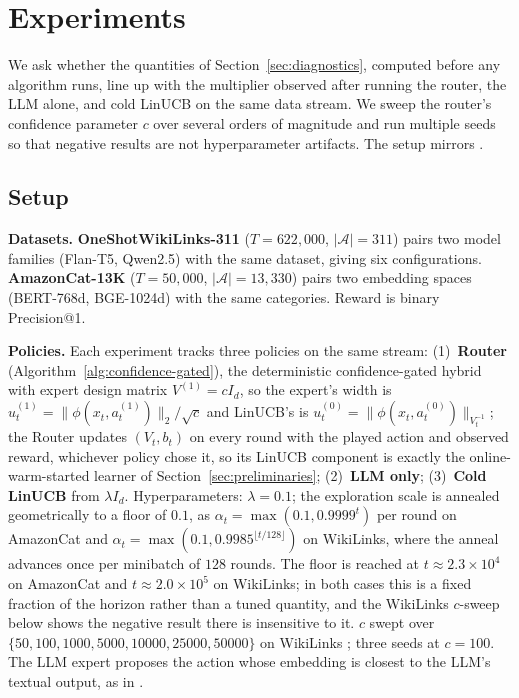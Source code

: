 \documentclass{article}
\theoremstyle{definition}
\theoremstyle{remark}
\theoremstyle{remark}
\begin{document}
\section{Experiments}
\label{sec:experiments}

We ask whether the quantities of Section~\ref{sec:diagnostics}, computed
before any algorithm runs, line up with the multiplier observed after running
the router, the LLM alone, and cold LinUCB on the same data stream. We sweep
the router's confidence parameter $c$ over several orders of magnitude and run
multiple seeds so that negative results are not hyperparameter artifacts. The
setup mirrors \cite{chen2024llmdecision}.

\subsection{Setup}
\label{sec:exp-setup}

\textbf{Datasets.} \textbf{OneShotWikiLinks-311} ($T\!=\!622{,}000$,
$|\mathcal A|\!=\!311$) pairs two model families (Flan-T5, Qwen2.5) with the
same dataset, giving six configurations. \textbf{AmazonCat-13K}
($T\!=\!50{,}000$, $|\mathcal A|\!=\!13{,}330$) pairs two embedding spaces
(BERT-768d, BGE-1024d) with the same categories. Reward is binary
Precision@1.

\textbf{Policies.} Each experiment tracks three policies on the same stream:
(1)~\textbf{Router} (Algorithm~\ref{alg:confidence-gated}), the deterministic
confidence-gated hybrid with expert design matrix $V^{(1)}=cI_d$, so the
expert's width is $u_t^{(1)}=\|\phi(x_t,a_t^{(1)})\|_2/\sqrt c$ and LinUCB's is
$u_t^{(0)}=\|\phi(x_t,a_t^{(0)})\|_{V_t^{-1}}$; the Router updates $(V_t,b_t)$ on
every round with the played action and observed reward, whichever policy
chose it, so its LinUCB component is exactly the online-warm-started learner
of Section~\ref{sec:preliminaries}; (2)~\textbf{LLM only}; (3)~\textbf{Cold
LinUCB} from $\lambda I_d$. Hyperparameters: $\lambda=0.1$; the exploration
scale is annealed geometrically to a floor of $0.1$, as
$\alpha_t=\max(0.1,0.9999^t)$ per round on AmazonCat and
$\alpha_t=\max(0.1,0.9985^{\lfloor t/128\rfloor})$ on WikiLinks, where the
anneal advances once per minibatch of $128$ rounds. The floor is reached at
$t\approx2.3\times10^4$ on AmazonCat and $t\approx2.0\times10^5$ on WikiLinks;
in both cases this is a fixed fraction of the horizon rather than a tuned
quantity, and the WikiLinks $c$-sweep below shows the negative result there is
insensitive to it. $c$ swept over
$\{50,100,1000,5000,10000,25000,50000\}$ on WikiLinks
; three seeds at $c=100$.
The LLM expert proposes the action whose embedding is closest to the LLM's
textual output, as in \cite{chen2024llmdecision}.
\end{document}
